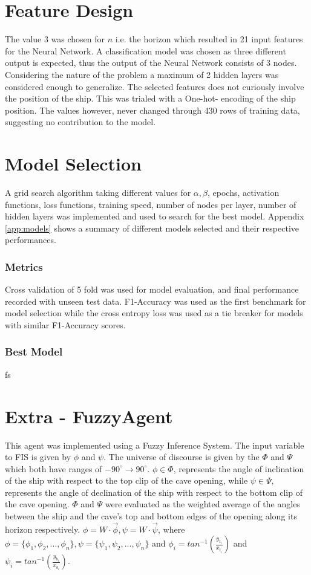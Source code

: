 \documentclass[10pt,journal,compsoc]{IEEEtran}
\begin{document}
\section{Feature Design}

The value 3 was chosen for $n$ i.e. the horizon which resulted in 21 input features for the Neural Network. 
A classification model was chosen as three different output is expected, thus the output of the Neural 
Network consists of 3 nodes.
Considering the nature of the problem a maximum of 2 hidden layers was considered enough to generalize. 
The selected features does not curiously involve the position of the ship. This was trialed with a One-hot-
encoding of the ship position. The values however, never changed through 430 rows of training data, 
suggesting no contribution to the model. 

\section{Model Selection}
A grid search algorithm taking different values for $\alpha, \beta$, epochs, activation functions, loss 
functions, training speed, number of nodes per layer, number of hidden layers was implemented and used
to search for the best model. Appendix \ref{app:models} shows a summary of different models selected and their 
respective performances. 

\subsubsection*{Metrics}
Cross validation of 5 fold was used for model evaluation, and final performance recorded with unseen test
data. F1-Accuracy was used as the first benchmark for model selection while the cross entropy loss was 
used as a tie breaker for models with similar F1-Accuracy scores. 

\subsubsection*{Best Model}
fs

\section{Extra - FuzzyAgent}
This agent was implemented using a Fuzzy Inference System. The input variable to FIS is given by $\phi$ 
and $\psi$. The universe of discourse is given by the  $\Phi$ and $\Psi$ which both have ranges of
$-90^{\circ} \to 90^{\circ}$. $\phi \in \Phi$, represents the angle of inclination of the ship with respect to the top clip of the cave
opening, while $\psi \in \Psi,$ represents the angle of declination of the ship with respect to the bottom clip
of the cave opening. $\Phi$ and $\Psi$ were evaluated as the weighted average of the angles between
the ship and the cave's top and bottom edges of the opening along its horizon respectively. $\phi = W \cdot \vec{\phi}, 
\psi = W \cdot \vec{\psi}$, where $\phi = \{\phi_1, \phi_2, ..., \phi_n\}, \psi = \{\psi_1, \psi_2, ..., 
\psi_n\}$ and $\phi_i = tan^{-1} \left(  \frac{y_{t_i}}{x_{t_i}}\right)$ and $\psi_i= tan^{-1} \left(  
\frac{y_{b_i}}{x_{b_i}}\right)$.
\end{document}
